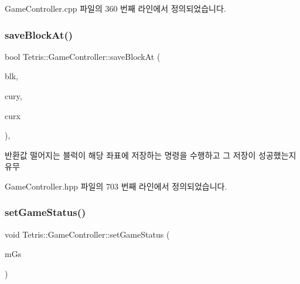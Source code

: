 Game\+Controller.\+cpp 파일의 360 번째 라인에서 정의되었습니다.

\mbox{\label{class_tetris_1_1_game_controller_adc067380df0f0da4ea4a358d00d6a123}} 
\subsubsection{\texorpdfstring{save\+Block\+At()}{saveBlockAt()}\hspace{0.1cm}{\footnotesize\ttfamily [2/2]}}
{\footnotesize\ttfamily bool Tetris\+::\+Game\+Controller\+::save\+Block\+At (\begin{DoxyParamCaption}\item[{\hyperlink{class_tetris_1_1_block}{Block} $\ast$}]{blk,  }\item[{unsigned short}]{cury,  }\item[{unsigned short}]{curx }\end{DoxyParamCaption})\hspace{0.3cm}{\ttfamily [inline]}, {\ttfamily [protected]}}

\begin{DoxyReturn}{반환값}
떨어지는 블럭이 해당 좌표에 저장하는 명령을 수행하고 그 저장이 성공했는지유무 
\end{DoxyReturn}


Game\+Controller.\+hpp 파일의 703 번째 라인에서 정의되었습니다.

\mbox{\label{class_tetris_1_1_game_controller_a013cef75ba09bdb7d95ae1df8497b8f5}} 
\subsubsection{\texorpdfstring{set\+Game\+Status()}{setGameStatus()}\hspace{0.1cm}{\footnotesize\ttfamily [1/2]}}
{\footnotesize\ttfamily void Tetris\+::\+Game\+Controller\+::set\+Game\+Status (\begin{DoxyParamCaption}\item[{\hyperlink{class_tetris_1_1_game_controller_a96a963b56385f3b3a122ff0ca2beb770}{Game\+Controller\+::\+Game\+Status}}]{m\+Gs }\end{DoxyParamCaption})\hspace{0.3cm}{\ttfamily [inline]}}



